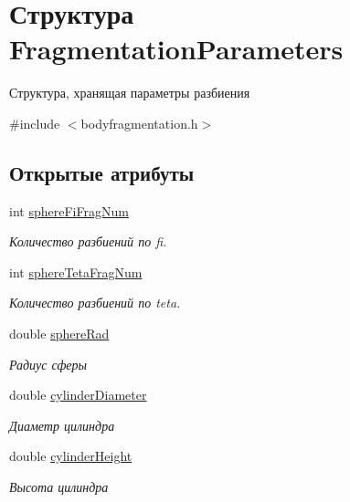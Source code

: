 \hypertarget{struct_fragmentation_parameters}{}\section{Структура Fragmentation\+Parameters}
\label{struct_fragmentation_parameters}


Структура, хранящая параметры разбиения  




{\ttfamily \#include $<$bodyfragmentation.\+h$>$}

\subsection*{Открытые атрибуты}
\begin{DoxyCompactItemize}
\item 
int \mbox{\hyperlink{group__sphere_parameters_ga713cc6115dea245daace4ad636a6c372}{sphere\+Fi\+Frag\+Num}}
\begin{DoxyCompactList}\small\item\em Количество разбиений по fi. \end{DoxyCompactList}\item 
int \mbox{\hyperlink{group__sphere_parameters_ga3b84127629eca0061dd4580b9c58fb2c}{sphere\+Teta\+Frag\+Num}}
\begin{DoxyCompactList}\small\item\em Количество разбиений по teta. \end{DoxyCompactList}\item 
double \mbox{\hyperlink{group__sphere_parameters_ga047538aed251173849c36520efbe8225}{sphere\+Rad}}
\begin{DoxyCompactList}\small\item\em Радиус сферы \end{DoxyCompactList}\item 
double \mbox{\hyperlink{group__cylinder_parameters_ga8f3c26e937891e983eb9a6f6c14e7c03}{cylinder\+Diameter}}
\begin{DoxyCompactList}\small\item\em Диаметр цилиндра \end{DoxyCompactList}\item 
double \mbox{\hyperlink{group__cylinder_parameters_gaa4dc4668f162a2f8c7bac221d8e3685a}{cylinder\+Height}}
\begin{DoxyCompactList}\small\item\em Высота цилиндра \end{DoxyCompactList}\item 

\end{DoxyCompactItemize}
